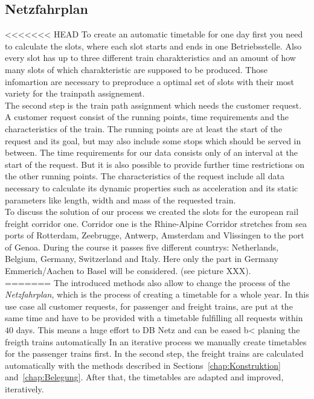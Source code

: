 \subsection{Netzfahrplan}
\label{chap:Netzfahrplan}
<<<<<<< HEAD
To create an automatic timetable for one day first you need to calculate the slots, where each slot starts and ends in one Betriebsstelle. Also every slot has up to three different train charakteristics and an amount of how many slots of which charakteristic are supposed to be produced. Those infomartion are necessary to preproduce a optimal set of slots with their most variety for the trainpath assignement.  \\
The second step is the train path assignment which needs the customer request. A customer request consist of the running points, time requirements and the characteristics of the train. The running points are at least the start of the request and its goal, but may also include some stops which should be served in between. The time requirements for our data consists only of an interval at the start of the request. But it is also possible to provide further time restrictions on the other running points. The characteristics of the request include all data necessary to calculate its dynamic properties such as acceleration and its static parameters like length, width and mass of the requested train.  \\
To discuss the solution of our process we created the slots for the european rail freight corridor one. Corridor one is the Rhine-Alpine Corridor stretches from sea ports of Rotterdam, Zeebrugge, Antwerp, Amsterdam and Vlissingen to the port of Genoa. During the course it passes five different countrys: Netherlands, Belgium, Germany, Switzerland and Italy. Here only the part in Germany Emmerich/Aachen to Basel will be considered. (see picture XXX). \\


=======
The introduced methods also allow to change the process of the \emph{Netzfahrplan}, which is the process of creating a timetable for a whole year. In this use case all customer requests, for passenger and freight trains, are put at the same time and have to be provided with a timetable fulfilling all requests within $40$ days. This means a huge effort to DB Netz and can be eased b< planing the freigth trains automatically In an iterative process we manually create timetables for the passenger trains first. In the second step, the freight trains are calculated automatically with the methods described in Sections~\ref{chap:Konstruktion} and~\ref{chap:Belegung}. After that, the timetables are adapted and improved, iteratively.


